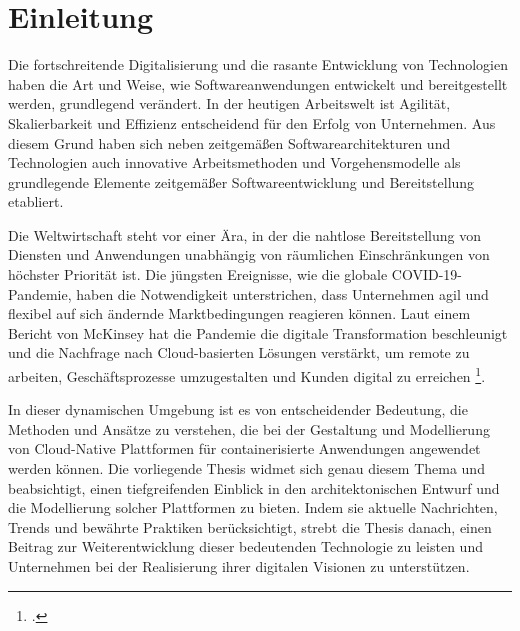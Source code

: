 \newpage
\section{Einleitung}\label{lab:einleitung}
Die fortschreitende Digitalisierung und die rasante Entwicklung von Technologien haben die Art und Weise, wie Softwareanwendungen entwickelt und bereitgestellt werden, grundlegend verändert. In der heutigen Arbeitswelt ist Agilität, Skalierbarkeit und Effizienz entscheidend für den Erfolg von Unternehmen. Aus diesem Grund haben sich neben zeitgemäßen Softwarearchitekturen und Technologien auch innovative Arbeitsmethoden und Vorgehensmodelle als grundlegende Elemente zeitgemäßer Softwareentwicklung und Bereitstellung etabliert.

Die Weltwirtschaft steht vor einer Ära, in der die nahtlose Bereitstellung von Diensten und Anwendungen unabhängig von räumlichen Einschränkungen von höchster Priorität ist. Die jüngsten Ereignisse, wie die globale COVID-19-Pandemie, haben die Notwendigkeit unterstrichen, dass Unternehmen agil und flexibel auf sich ändernde Marktbedingungen reagieren können. Laut einem Bericht von McKinsey hat die Pandemie die digitale Transformation beschleunigt und die Nachfrage nach Cloud-basierten Lösungen verstärkt, um remote zu arbeiten, Geschäftsprozesse umzugestalten und Kunden digital zu erreichen \footcite[Vgl.][o.S.]{McKinsey2020}.



In dieser dynamischen Umgebung ist es von entscheidender Bedeutung, die Methoden und Ansätze zu verstehen, die bei der Gestaltung und Modellierung von Cloud-Native Plattformen für containerisierte Anwendungen angewendet werden können. Die vorliegende Thesis widmet sich genau diesem Thema und beabsichtigt, einen tiefgreifenden Einblick in den architektonischen Entwurf und die Modellierung solcher Plattformen zu bieten. Indem sie aktuelle Nachrichten, Trends und bewährte Praktiken berücksichtigt, strebt die Thesis danach, einen Beitrag zur Weiterentwicklung dieser bedeutenden Technologie zu leisten und Unternehmen bei der Realisierung ihrer digitalen Visionen zu unterstützen.
%




